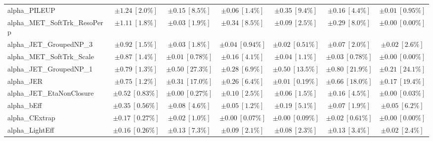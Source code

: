 \begin{sidewaystable}
\begin{center}
\begin{tabular*}{\textwidth}{@{\extracolsep{\fill}}lcccccc}
alpha\_PILEUP         & $\pm 1.24\ [2.0\%] $          & $\pm 0.15\ [8.5\%] $          & $\pm 0.06\ [1.4\%] $          & $\pm 0.35\ [9.4\%] $          & $\pm 0.16\ [4.4\%] $          & $\pm 0.01\ [0.95\%] $       \\
alpha\_MET\_SoftTrk\_ResoPerp         & $\pm 1.11\ [1.8\%] $          & $\pm 0.03\ [1.9\%] $          & $\pm 0.34\ [8.5\%] $          & $\pm 0.09\ [2.5\%] $          & $\pm 0.29\ [8.0\%] $          & $\pm 0.00\ [0.00\%] $       \\
alpha\_JET\_GroupedNP\_3         & $\pm 0.92\ [1.5\%] $          & $\pm 0.03\ [1.8\%] $          & $\pm 0.04\ [0.94\%] $          & $\pm 0.02\ [0.51\%] $          & $\pm 0.07\ [2.0\%] $          & $\pm 0.02\ [2.6\%] $       \\
alpha\_MET\_SoftTrk\_Scale         & $\pm 0.87\ [1.4\%] $          & $\pm 0.01\ [0.78\%] $          & $\pm 0.16\ [4.1\%] $          & $\pm 0.04\ [1.1\%] $          & $\pm 0.03\ [0.78\%] $          & $\pm 0.00\ [0.00\%] $       \\
alpha\_JET\_GroupedNP\_1         & $\pm 0.79\ [1.3\%] $          & $\pm 0.50\ [27.3\%] $          & $\pm 0.28\ [6.9\%] $          & $\pm 0.50\ [13.5\%] $          & $\pm 0.80\ [21.9\%] $          & $\pm 0.21\ [24.1\%] $       \\
alpha\_JER         & $\pm 0.75\ [1.2\%] $          & $\pm 0.31\ [17.0\%] $          & $\pm 0.26\ [6.4\%] $          & $\pm 0.01\ [0.19\%] $          & $\pm 0.66\ [18.0\%] $          & $\pm 0.17\ [19.4\%] $       \\
alpha\_JET\_EtaNonClosure         & $\pm 0.52\ [0.83\%] $          & $\pm 0.00\ [0.27\%] $          & $\pm 0.10\ [2.5\%] $          & $\pm 0.06\ [1.5\%] $          & $\pm 0.16\ [4.5\%] $          & $\pm 0.00\ [0.03\%] $       \\
alpha\_bEff         & $\pm 0.35\ [0.56\%] $          & $\pm 0.08\ [4.6\%] $          & $\pm 0.05\ [1.2\%] $          & $\pm 0.19\ [5.1\%] $          & $\pm 0.07\ [1.9\%] $          & $\pm 0.05\ [6.2\%] $       \\
alpha\_CExtrap         & $\pm 0.17\ [0.27\%] $          & $\pm 0.02\ [1.0\%] $          & $\pm 0.00\ [0.07\%] $          & $\pm 0.00\ [0.09\%] $          & $\pm 0.02\ [0.61\%] $          & $\pm 0.00\ [0.00\%] $       \\
alpha\_LightEff         & $\pm 0.16\ [0.26\%] $          & $\pm 0.13\ [7.3\%] $          & $\pm 0.09\ [2.1\%] $          & $\pm 0.08\ [2.3\%] $          & $\pm 0.13\ [3.4\%] $          & $\pm 0.02\ [2.4\%] $       \\

\end{tabular*}
\end{center}
\end{sidewaystable}
